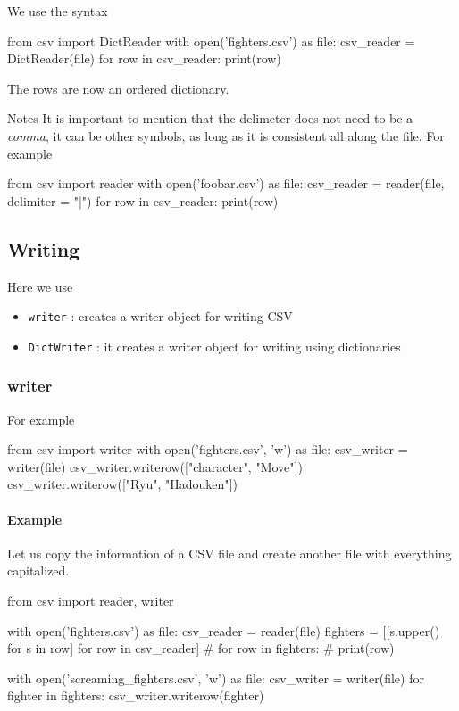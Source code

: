 We use the syntax 
\begin{listing}{1}
from csv import DictReader
with open('fighters.csv') as file:
    csv_reader = DictReader(file)
    for row in csv_reader:
        print(row)    
\end{listing}
The rows are now an ordered dictionary.

\begin{shaded}{Notes}
It is important to mention that the delimeter does not need to be a \emph{comma}, it can be other symbols, as long as it is consistent all along the file. For example 
\begin{listing}{1}
from csv import reader
with open('foobar.csv') as file:
    csv_reader = reader(file, delimiter = "|")
    for row in csv_reader:
        print(row)
\end{listing}
\end{shaded}


\subsection{Writing}

Here we use 
\begin{itemize}
    \item \verb|writer| : creates a writer object for writing CSV
    \item \verb|DictWriter| : it creates a writer object for writing using dictionaries 
\end{itemize}

\subsubsection{writer}

For example 
\begin{listing}{1}
from csv import writer
with open('fighters.csv', 'w') as file:
    csv_writer = writer(file)    
    csv_writer.writerow(["character", "Move"])
    csv_writer.writerow(["Ryu", "Hadouken"])
\end{listing}

\paragraph{Example} Let us copy the information of a CSV file and create another file with everything capitalized. 
\begin{listing}{1}
from csv import reader, writer

with open('fighters.csv') as file:
    csv_reader = reader(file)
    fighters = [[s.upper() for s in row] for row in csv_reader]
    # for row in fighters:
    #     print(row)

with open('screaming_fighters.csv', 'w') as file:
    csv_writer = writer(file)
    for fighter in fighters:
        csv_writer.writerow(fighter)    
\end{listing}

